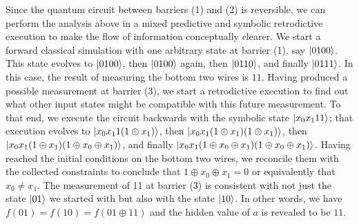 \documentclass{article}
\begin{document}
\begin{refsection}
Since the quantum circuit between barriers (1) and (2) is reversible,
we can perform the analysis above in a mixed predictive and symbolic
retrodictive execution to make the flow of information conceptually
clearer. We start a forward classical simulation with one arbitrary
state at barrier (1), say $\ket{0100}$.  This state evolves to
$\ket{0100}$, then $\ket{0100}$ again, then $\ket{0110}$, and finally
$\ket{0111}$. In this case, the result of measuring the bottom two
wires is $11$. Having produced a possible measurement at barrier (3),
we start a retrodictive execution to find out what other input states
might be compatible with this future measurement. To that end, we
execute the circuit backwards with the symbolic state
$\ket{x_0x_111}$; that execution evolves to $\ket{x_0x_11(1\oplus
  x_1)}$, then $\ket{x_0x_1(1\oplus x_1)(1\oplus x_1)}$, then
$\ket{x_0x_1(1\oplus x_1)(1\oplus x_0 \oplus x_1)}$, and finally
$\ket{x_0x_1(1\oplus x_0 \oplus x_1)(1\oplus x_0 \oplus x_1)}$. Having
reached the initial conditions on the bottom two wires, we reconcile
them with the collected constraints to conclude that $1 \oplus x_0
\oplus x_1 = 0$ or equivalently that $x_0 \neq x_1$. The measurement
of 11 at barrier (3) is consistent with not just the state $\ket{01}$
we started with but also with the state $\ket{10}$. In other words, we
have $f(01) = f(10) = f(01 \oplus 11)$ and the hidden value of $a$ is
revealed to be $11$.


\end{refsection}
\end{document}
